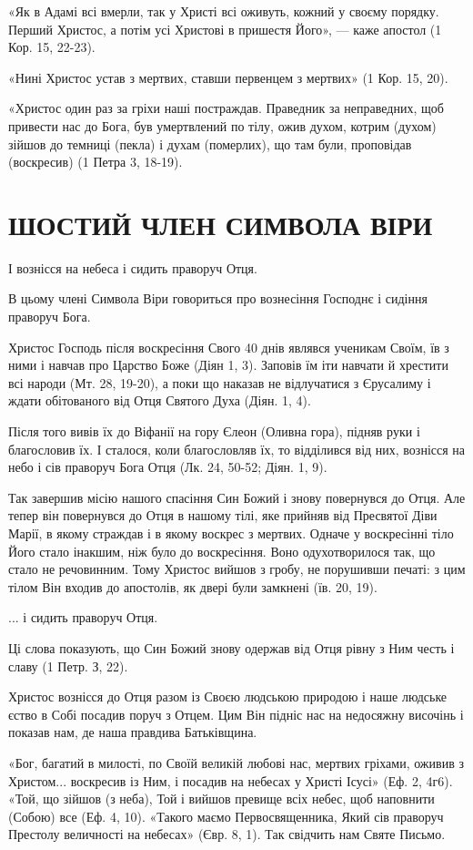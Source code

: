 \documentclass[main.tex]{subfiles}
\begin{document}
«Як в Адамі всі вмерли, так у Христі всі оживуть, кожний у своєму порядку. Перший Христос, а потім усі Христові в пришестя Його», — каже апостол (1 Кор. 15, 22-23).

«Нині Христос устав з мертвих, ставши первенцем з мертвих» (1 Кор. 15, 20).

«Христос один раз за гріхи наші постраждав. Праведник за неправедних, щоб привести нас до Бога, був умертвлений по тілу, ожив духом, котрим (духом) зійшов до темниці (пекла) і духам (померлих), що там були, проповідав (воскресив) (1 Петра 3, 18-19).

\section{ШОСТИЙ ЧЛЕН СИМВОЛА ВІРИ}

І вознісся на небеса і сидить праворуч Отця.

В цьому члені Символа Віри говориться про вознесіння Господнє і сидіння праворуч Бога.
 
Христос Господь після воскресіння Свого 40 днів являвся ученикам Своїм, їв з ними і навчав про Царство Боже (Діян 1, 3). Заповів їм іти навчати й хрестити всі народи (Мт. 28, 19-20), а поки що наказав не відлучатися з Єрусалиму і ждати обітованого від Отця Святого Духа (Діян. 1, 4).

Після того вивів їх до Віфанії на гору Єлеон (Оливна гора), підняв руки і благословив їх. І сталося, коли благословляв їх, то відділився від них, вознісся на небо і сів праворуч Бога Отця (Лк. 24, 50-52; Діян. 1, 9).

Так завершив місію нашого спасіння Син Божий і знову повернувся до Отця. Але тепер він повернувся до Отця в нашому тілі, яке прийняв від Пресвятої Діви Марії, в якому страждав і в якому воскрес з мертвих. Одначе у воскресінні тіло Його стало інакшим, ніж було до воскресіння. Воно одухотворилося так, що стало не речовинним. Тому Христос вийшов з гробу, не порушивши печаті: з цим тілом Він входив до апостолів, як двері були замкнені (їв. 20, 19).

... і сидить праворуч Отця.

Ці слова показують, що Син Божий знову одержав від Отця рівну з Ним честь і славу (1 Петр. З, 22).

Христос вознісся до Отця разом із Своєю людською природою і наше людське єство в Собі посадив поруч з Отцем. Цим Він підніс нас на недосяжну височінь і показав нам, де наша правдива Батьківщина.

«Бог, багатий в милості, по Своїй великій любові нас, мертвих гріхами, оживив з Христом... воскресив із Ним, і посадив на небесах у Христі Ісусі» (Еф. 2, 4г6). «Той, що зійшов (з неба), Той і вийшов превище всіх небес, щоб наповнити (Собою) все (Еф. 4, 10). «Такого маємо Первосвященника, Який сів праворуч Престолу величності на небесах» (Євр. 8, 1). Так свідчить нам Святе Письмо.
\end{document}
